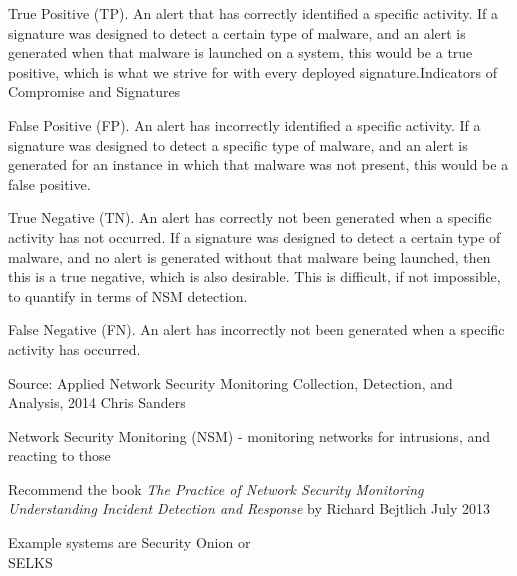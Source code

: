\documentclass[Screen16to9,17pt]{foils}
\begin{document}

\begin{list2}
\item True Positive (TP). An alert that has correctly identified a specific activity. If a signature was designed to detect a certain type of malware, and an alert is generated when that malware is launched on a system, this would be a true positive, which is what we strive for with every deployed signature.Indicators of Compromise and Signatures
\item False Positive (FP). An alert has incorrectly identified a specific activity. If a signature was designed to detect a specific type of malware, and an alert is generated for an instance in which that malware was not present, this would be a false positive.
\item True Negative (TN). An alert has correctly not been generated when a specific activity has not occurred. If a signature was designed to detect a certain type of malware, and no alert is generated without that malware being launched, then this is a true negative, which is also desirable. This is difficult, if not impossible, to quantify in terms of NSM detection.
\item False Negative (FN). An alert has incorrectly not been generated when a specific activity has occurred.
\end{list2}

Source: Applied Network Security Monitoring Collection, Detection, and Analysis, 2014 Chris Sanders



\begin{list1}
\item Network Security Monitoring (NSM) - monitoring networks for intrusions, and reacting to those
\item Recommend the book \emph{The Practice of Network Security Monitoring
Understanding Incident Detection and Response}
by Richard Bejtlich
July 2013
\item Example systems are Security Onion  or\\ SELKS 
\end{list1}



\end{document}
